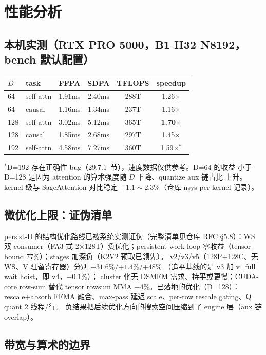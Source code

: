 \section{性能分析}

\subsection{本机实测（RTX PRO 5000，B1 H32 N8192，bench 默认配置）}

\begin{center}
\begin{tabular}{llcccc}
\toprule
$D$ & task & FFPA & SDPA & TFLOPS & speedup \\
\midrule
64  & self-attn & 1.91ms & 2.40ms & 288T & 1.26$\times$ \\
64  & causal    & 1.16ms & 1.34ms & 237T & 1.16$\times$ \\
128 & self-attn & 3.02ms & 5.12ms & 365T & \textbf{1.70$\times$} \\
128 & causal    & 1.85ms & 2.68ms & 297T & 1.45$\times$ \\
192 & self-attn & 4.58ms & 7.27ms & 360T & 1.59$\times$$^{*}$ \\
\bottomrule
\end{tabular}
\end{center}
$^{*}$D=192 存在正确性 bug（29.7.1~节），速度数据仅供参考。D=64 的收益
小于 D=128 是因为 attention 的算术强度随 $D$ 下降、quantize aux 链占比
上升。kernel 级与 SageAttention 对比稳定 $+1.1\sim2.3\%$（仓库 nsys
per-kernel 记录）。

\subsection{微优化上限：证伪清单}

persist-D 的结构优化路线已被系统实测证伪（完整清单见仓库 RFC
\S5.8）：WS 双 consumer（FA3 式 2$\times$128T）负优化；persistent work
loop 零收益（tensor-bound 77\%）；stages 加深负（K2V2 预取已领先）。
v2/v3/v5（128P+128C、无 WS、V 驻留寄存器）分别 $+31.6\%$/$+1.4\%$/$+48\%$
（追平基线的是 v3 加 v\_full wait hoist，即 v4，$-0.1\%$）；
cluster 化无 DSMEM 需求、持平或更慢；CUDA-core row-sum 替代 tensor
rowsum MMA $-4\%$。已落地的优化（D=128）：rescale+absorb FFMA
融合、max-pass 延迟 scale、per-row rescale gating、Q quant 2 线程/行。
负结果把后续优化方向的搜索空间压缩到了 engine 层（aux 链 overlap）。

\subsection{带宽与算术的边界}

